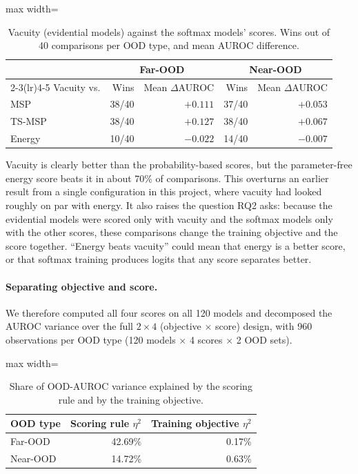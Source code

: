 \begin{table}[H]
\centering
\caption{Vacuity (evidential models) against the softmax models' scores. Wins out of 40 comparisons per
OOD type, and mean AUROC difference.}
\label{tab:vacuity-wins}
\begin{adjustbox}{max width=\textwidth}
\begin{tabular}{@{}lrrrr@{}}
\toprule
& \multicolumn{2}{c}{Far-OOD} & \multicolumn{2}{c}{Near-OOD} \\
\cmidrule(lr){2-3}\cmidrule(lr){4-5}
Vacuity vs. & Wins & Mean $\Delta$AUROC & Wins & Mean $\Delta$AUROC \\
\midrule
MSP & 38/40 & $+0.111$ & 37/40 & $+0.053$ \\
TS-MSP & 38/40 & $+0.127$ & 38/40 & $+0.067$ \\
Energy & 10/40 & $-0.022$ & 14/40 & $-0.007$ \\
\bottomrule
\end{tabular}
\end{adjustbox}
\end{table}

Vacuity is clearly better than the probability-based scores, but the parameter-free energy score beats it
in about 70\% of comparisons. This overturns an earlier result from a single configuration in this
project, where vacuity had looked roughly on par with energy. It also raises the question RQ2 asks:
because the evidential models were scored only with vacuity and the softmax models only with the other
scores, these comparisons change the training objective and the score together. ``Energy beats vacuity''
could mean that energy is a better score, or that softmax training produces logits that any score
separates better.

\paragraph{Separating objective and score.} We therefore computed all four scores on all 120 models and
decomposed the AUROC variance over the full $2 \times 4$ (objective $\times$ score) design, with 960
observations per OOD type (120 models $\times$ 4 scores $\times$ 2 OOD sets).

\begin{table}[H]
\centering
\caption{Share of OOD-AUROC variance explained by the scoring rule and by the training objective.}
\label{tab:rq2}
\begin{adjustbox}{max width=\textwidth}
\begin{tabular}{@{}lrr@{}}
\toprule
OOD type & Scoring rule $\eta^2$ & Training objective $\eta^2$ \\
\midrule
Far-OOD & 42.69\% & 0.17\% \\
Near-OOD & 14.72\% & 0.63\% \\
\bottomrule
\end{tabular}
\end{adjustbox}
\end{table}

